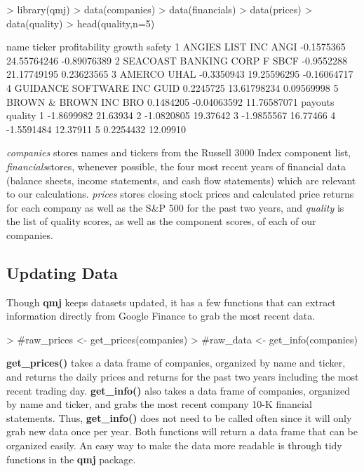 \documentclass[titlepage]{article}
\begin{document}
\begin{Schunk}
\begin{Sinput}
> library(qmj)
> data(companies) 
> data(financials) 
> data(prices) 
> data(quality)
> head(quality,n=5)
\end{Sinput}
\begin{Soutput}
                     name ticker profitability      growth      safety
1         ANGIES LIST INC   ANGI    -0.1575365 24.55764246 -0.89076389
2 SEACOAST BANKING CORP F   SBCF    -0.9552288 21.17749195  0.23623565
3                  AMERCO   UHAL    -0.3350943 19.25596295 -0.16064717
4   GUIDANCE SOFTWARE INC   GUID     0.2245725 13.61798234  0.09569998
5       BROWN & BROWN INC    BRO     0.1484205 -0.04063592 11.76587071
     payouts  quality
1 -1.8699982 21.63934
2 -1.0820805 19.37642
3 -1.9855567 16.77466
4 -1.5591484 12.37911
5  0.2254432 12.09910
\end{Soutput}
\end{Schunk}

\textit{companies} stores names and tickers from the Russell 3000 Index component list, \textit{financials}stores, whenever possible, the four most recent years of financial data (balance sheets, income statements, and cash flow statements) which are relevant to our calculations. \textit{prices} stores closing stock prices and calculated price returns for each company as well as the S\&P 500 for the past two years, and \textit{quality} is the list of quality scores, as well as the component scores, of each of our companies.

\subsection*{Updating Data}

Though \textbf{qmj} keeps datasets updated, it has a few functions that can extract information directly from Google Finance to grab the most recent data. 

\begin{Schunk}
\begin{Sinput}
> #raw_prices <- get_prices(companies)
> #raw_data <- get_info(companies)
\end{Sinput}
\end{Schunk}

\textbf{get\_prices()} takes a data frame of companies, organized by name and ticker, and returns the daily prices and returns for the past two years including the most recent trading day. \textbf{get\_info()} also takes a data frame of companies, organized by name and ticker, and grabs the most recent company 10-K financial statements. Thus, \textbf{get\_info()} does not need to be called often since it will only grab new data once per year. Both functions will return a data frame that can be organized easily. An easy way to make the data more readable is through tidy functions in the \textbf{qmj} package. 
\end{document}
